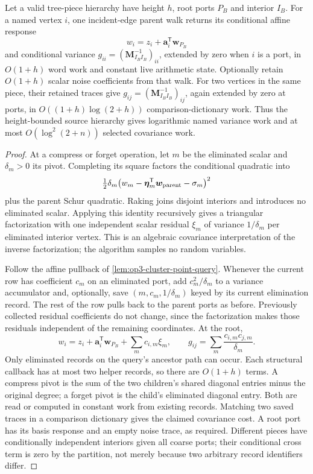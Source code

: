 \begin{lemma}
\label{lem:op3-cluster-conditional-green}
Let a valid tree-piece hierarchy have height $h$, root ports $P_B$ and
interior $I_B$. For a named vertex $i$, one incident-edge parent walk returns
its conditional affine response
\[
 w_i=z_i+\boldsymbol a_i^{\mathsf T}\boldsymbol w_{P_B}
\]
and conditional variance
$g_{ii}=(\boldsymbol M_{I_BI_B}^{-1})_{ii}$, extended by zero when $i$
is a port, in $O(1+h)$ word work and constant live arithmetic state.
Optionally retain $O(1+h)$ scalar noise coefficients from that walk.
For two vertices in the same piece, their retained traces give
$g_{ij}=(\boldsymbol M_{I_BI_B}^{-1})_{ij}$, again extended by zero at
ports, in $O((1+h)\log(2+h))$ comparison-dictionary work.
Thus the height-bounded source hierarchy gives logarithmic named variance
work and at most $O(\log^2(2+n))$ selected covariance work.
\end{lemma}
\begin{proof}
At a compress or forget operation, let $m$ be the eliminated scalar and
$\delta_m>0$ its pivot. Completing its square factors the conditional
quadratic into
\[
 \tfrac12\delta_m
 \bigl(w_m-\boldsymbol\eta_m^{\mathsf T}\boldsymbol w_{\rm parent}
              -\sigma_m\bigr)^2
\]
plus the parent Schur quadratic. Raking joins disjoint interiors and
introduces no eliminated scalar. Applying this identity recursively gives
a triangular factorization with one independent scalar residual
$\xi_m$ of variance $1/\delta_m$ per eliminated interior vertex. This is
an algebraic covariance interpretation of the inverse factorization;
the algorithm samples no random variables.

Follow the affine pullback of \cref{lem:op3-cluster-point-query}. Whenever
the current row has coefficient $c_m$ on an eliminated port, add
$c_m^2/\delta_m$ to a variance accumulator and, optionally, save
$(m,c_m,1/\delta_m)$ keyed by its current elimination record. The rest of
the row pulls back to the parent ports as before. Previously collected
residual coefficients do not change, since the factorization makes those
residuals independent of the remaining coordinates. At the root,
\[
 w_i=z_i+\boldsymbol a_i^{\mathsf T}\boldsymbol w_{P_B}
          +\sum_m c_{i,m}\xi_m,
 \qquad
 g_{ij}=\sum_m\frac{c_{i,m}c_{j,m}}{\delta_m}.
\]
Only eliminated records on the query's ancestor path can occur. Each
structural callback has at most two helper records, so there are $O(1+h)$
terms. A compress pivot is the sum of the two children's shared diagonal
entries minus the original degree; a forget pivot is the child's eliminated
diagonal entry. Both are read or computed in constant work from existing
records. Matching two saved traces in a comparison dictionary gives the
claimed covariance cost. A root port has its basis response and an empty
noise trace, as required. Different pieces have conditionally independent
interiors given all coarse ports; their conditional cross term is zero by
the partition, not merely because two arbitrary record identifiers differ.
\end{proof}

